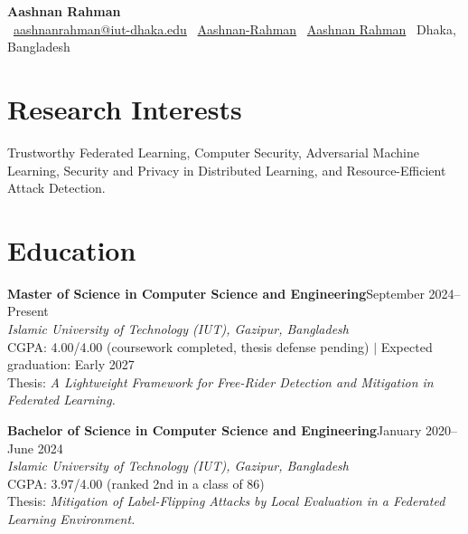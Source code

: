 \documentclass[10pt,letterpaper]{article}
\newcommand{\entry}[3]{%
    \textbf{#1}\hfill #2\\[-1pt]
    #3
}
\begin{document}
\begin{center}
    {\fontsize{24pt}{26pt}\selectfont\textbf{Aashnan Rahman}}\\[7pt]
    \faEnvelope~\href{mailto:aashnanrahman@iut-dhaka.edu}{aashnanrahman@iut-dhaka.edu}
    \quad
    \faGithub~\href{https://github.com/Aashnan-Rahman}{Aashnan-Rahman}
    \quad
    \faGraduationCap~\href{https://scholar.google.com/citations?user=fVx0lr4AAAAJ&hl=en&oi=ao}{Aashnan Rahman}
    \quad
    \faMapMarker*~Dhaka, Bangladesh
\end{center}

\vspace{-4pt}

\section{Research Interests}
Trustworthy Federated Learning, Computer Security, Adversarial Machine Learning, Security and Privacy in Distributed Learning, and Resource-Efficient Attack Detection. 

\section{Education}
\entry{Master of Science in Computer Science and Engineering}{September 2024--Present}{%
    \textit{Islamic University of Technology (IUT), Gazipur, Bangladesh}\\[-1pt]
    CGPA: 4.00/4.00 (coursework completed, thesis defense pending) \quad $|$ \quad Expected graduation: Early 2027\\[-1pt]
    Thesis: \textit{A Lightweight Framework for Free-Rider Detection and Mitigation in Federated Learning.}
}

\vspace{5pt}

\entry{Bachelor of Science in Computer Science and Engineering}{January 2020--June 2024}{%
    \textit{Islamic University of Technology (IUT), Gazipur, Bangladesh}\\[-1pt]
    CGPA: 3.97/4.00 (ranked 2nd in a class of 86)\\[-1pt]
    Thesis: \textit{Mitigation of Label-Flipping Attacks by Local Evaluation in a Federated Learning Environment.}
}
\end{document}
